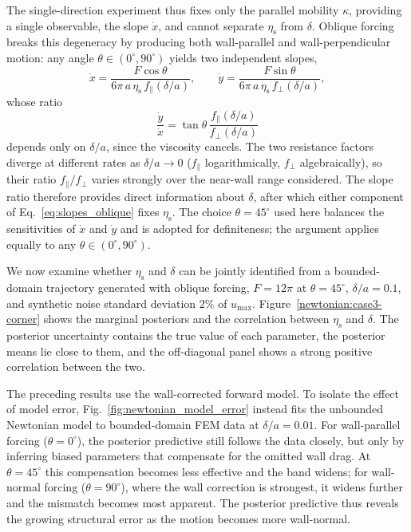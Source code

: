 \documentclass{elsarticle}
\begin{document}
The single-direction experiment thus fixes only the parallel mobility
$\kappa$, providing a single observable, the slope $\dot{x}$, and cannot
separate $\eta_{\mathrm{s}}$ from $\delta$. Oblique forcing breaks this
degeneracy by producing both wall-parallel and wall-perpendicular motion:
any angle $\theta \in (0^{\circ},90^{\circ})$ yields two independent
slopes,
\begin{equation}
\dot{x}
=
\frac{F\cos\theta}
{6\pi\,a\,\eta_{\mathrm{s}}\,f_{\parallel}(\delta/a)},
\qquad
\dot{y}
=
\frac{F\sin\theta}
{6\pi\,a\,\eta_{\mathrm{s}}\,f_{\perp}(\delta/a)},
\label{eq:slopes_oblique}
\end{equation}
whose ratio
\begin{equation}
\frac{\dot{y}}{\dot{x}}
=
\tan\theta\,
\frac{f_{\parallel}(\delta/a)}{f_{\perp}(\delta/a)}
\label{eq:slope_ratio}
\end{equation}
depends only on $\delta/a$, since the viscosity cancels. The two
resistance factors diverge at different rates as $\delta/a \to 0$
($f_{\parallel}$ logarithmically, $f_{\perp}$ algebraically), so their
ratio $f_{\parallel}/f_{\perp}$ varies strongly over the near-wall range
considered. The slope ratio therefore provides direct information about
$\delta$, after which either component of Eq.~\eqref{eq:slopes_oblique}
fixes $\eta_{\mathrm{s}}$. The choice $\theta = 45^{\circ}$ used here
balances the sensitivities of
$\dot{x}$ and $\dot{y}$ and is adopted for definiteness; the argument
applies equally to any $\theta \in (0^{\circ}, 90^{\circ})$.

We now examine whether $\eta_{\mathrm{s}}$ and $\delta$ can be jointly
identified from a bounded-domain trajectory generated with oblique
forcing, $F=12\pi$ at $\theta=45^\circ$, $\delta/a=0.1$, and synthetic
noise standard deviation $2\%$ of $u_{\max}$.
Figure~\ref{newtonian:case3-corner} shows the
marginal posteriors and the correlation between $\eta_{\mathrm{s}}$ and
$\delta$. The posterior uncertainty contains the true value of each
parameter, the posterior means lie close to them, and the off-diagonal
panel shows a strong positive correlation between the two.

The preceding results use the wall-corrected forward model. To isolate
the effect of model error, Fig.~\ref{fig:newtonian_model_error} instead
fits the unbounded Newtonian model to bounded-domain FEM data at
$\delta/a=0.01$. For wall-parallel forcing ($\theta=0^\circ$), the
posterior predictive still follows the data closely, but only by
inferring biased parameters that compensate for the omitted wall drag. At
$\theta=45^\circ$ this compensation becomes less effective and the band
widens; for wall-normal forcing ($\theta=90^\circ$), where the wall
correction is strongest, it widens further and the mismatch becomes most
apparent. The posterior predictive thus reveals the growing structural
error as the motion becomes more wall-normal.
\end{document}
